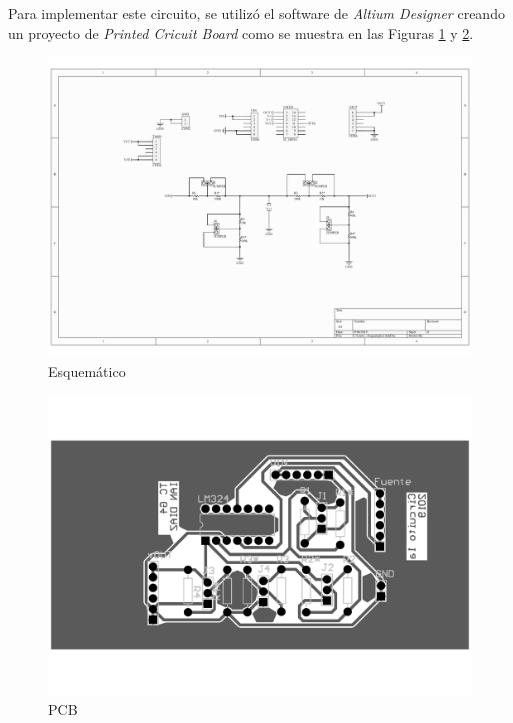 Para implementar este circuito, se utilizó el software de \emph{Altium
Designer} creando un proyecto de \emph{Printed Cricuit Board} como
se muestra en las Figuras \ref{1_a_sche} y \ref{1_a_pcb}.

\begin{figure}[H]
\begin{centering}
\includegraphics[scale=0.5]{../Ex1/iA/Resources1a/Schematic}
\par\end{centering}
\caption{Esquemático}
\label{1_a_sche}

\end{figure}

\begin{figure}[H]
\begin{centering}
\includegraphics[scale=0.3]{../Ex1/iA/Resources1a/PCB}
\par\end{centering}
\caption{PCB}
\label{1_a_pcb}

\end{figure}

